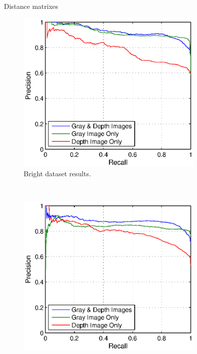 \documentclass[]{spie}  %
\begin{document}
\begin{figure}[!htb]
        \hspace{-3mm}
        \caption{Distance matrixes}
        \label{fig:dist_matrices}
\end{figure}



\begin{figure}[!htb]
        \centering
        
        \begin{subfigure}[b]{0.48\textwidth}
        \centering
        \includegraphics[trim = 0mm 0mm 5mm 0mm, clip, width=\textwidth]{figures/pr_bright.eps}    
        \caption{Bright dataset results.}
        \label{subfig:pr_bright}
        \end{subfigure}
        ~ 
        \begin{subfigure}[b]{0.48\textwidth}
        \centering
        \includegraphics[trim = 0mm 0mm 5mm 0mm, clip, width=\textwidth]{figures/pr_dim.eps}    

\end{subfigure}
\end{figure}
\end{document}
